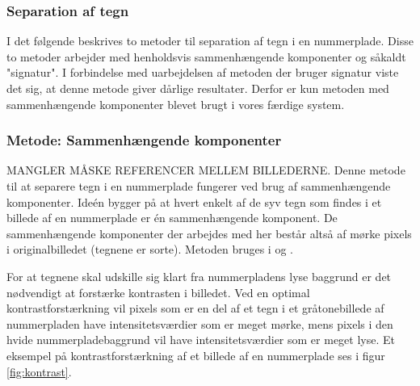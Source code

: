 \subsubsection{Separation af tegn}





I det følgende beskrives to metoder til separation af tegn i en nummerplade. Disse to metoder arbejder med henholdsvis sammenhængende komponenter og såkaldt "signatur". I forbindelse med uarbejdelsen af metoden der bruger signatur viste det sig, at denne metode giver dårlige resultater. Derfor er kun metoden med sammenhængende komponenter blevet brugt i vores færdige system.


\subsubsection*{Metode: Sammenhængende komponenter}

MANGLER MÅSKE REFERENCER MELLEM BILLEDERNE.
Denne metode til at separere tegn i en nummerplade fungerer ved brug af sammenhængende komponenter. Ideén bygger på at hvert enkelt af de syv tegn som findes i et billede af en nummerplade er én sammenhængende komponent. De sammenhængende komponenter der arbejdes med her består altså af mørke pixels i originalbilledet (tegnene er sorte). Metoden bruges i \cite{nijhuis} og \cite{kwas}.

For at tegnene skal udskille sig klart fra nummerpladens lyse baggrund er det nødvendigt at forstærke kontrasten i billedet. Ved en optimal kontrastforstærkning vil pixels som er en del af et tegn i et gråtonebillede af nummerpladen have intensitetsværdier som er meget mørke, mens pixels i den hvide nummerpladebaggrund vil have intensitetsværdier som er meget lyse. Et eksempel på kontrastforstærkning af et billede af en nummerplade ses i figur \vref{fig:kontrast}.

